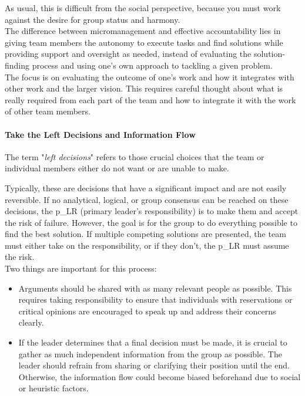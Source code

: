 As usual, this is difficult from the social perspective, because you must work against the desire for group status and harmony.\\

The difference between micromanagement and effective accountability lies in giving team members the autonomy to execute tasks and find solutions while providing support and oversight as needed, instead of evaluating the solution-finding process and using one's own approach to tackling a given problem.\\

The focus is on evaluating the outcome of one's work and how it integrates with other work and the larger vision. This requires careful thought about what is really required from each part of the team and how to integrate it with the work of other team members.

\paragraph{Take the Left Decisions and Information Flow}
The term "\textit{left decisions}" refers to those crucial choices that the team or individual members either do not want or are unable to make.

Typically, these are decisions that have a significant impact and are not easily reversible. If no analytical, logical, or group consensus can be reached on these decisions, the \gls{p_LR} (primary leader's responsibility) is to make them and accept the risk of failure. However, the goal is for the group to do everything possible to find the best solution. If multiple competing solutions are presented, the team must either take on the responsibility, or if they don't, the \gls{p_LR} must assume the risk.\\

Two things are important for this process:
\begin{itemize}
	\item Arguments should be shared with as many relevant people as possible. This requires taking responsibility to ensure that individuals with reservations or critical opinions are encouraged to speak up and address their concerns clearly.
	\item If the leader determines that a final decision must be made, it is crucial to gather as much independent information from the group as possible. The leader should refrain from sharing or clarifying their position until the end. Otherwise, the information flow could become biased beforehand due to social or heuristic factors.
\end{itemize}

